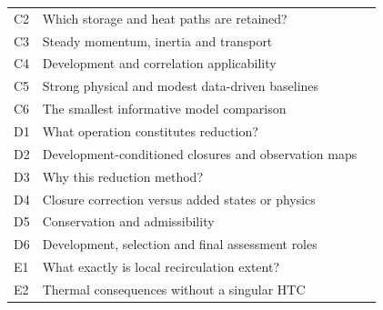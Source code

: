 \begin{longtable}{@{}p{0.45in}p{4.85in}p{0.40in}@{}}
C2 & Which storage and heat paths are retained? & \hyperref[topic:which-storage-and-heat-paths-are-retained]{\pageref*{topic:which-storage-and-heat-paths-are-retained}}\\
C3 & Steady momentum, inertia and transport & \hyperref[topic:steady-momentum-inertia-and-transport]{\pageref*{topic:steady-momentum-inertia-and-transport}}\\
C4 & Development and correlation applicability & \hyperref[topic:development-and-correlation-applicability]{\pageref*{topic:development-and-correlation-applicability}}\\
C5 & Strong physical and modest data-driven baselines & \hyperref[topic:strong-physical-and-modest-data-driven-baselines]{\pageref*{topic:strong-physical-and-modest-data-driven-baselines}}\\
C6 & The smallest informative model comparison & \hyperref[topic:the-smallest-informative-model-comparison]{\pageref*{topic:the-smallest-informative-model-comparison}}\\
D1 & What operation constitutes reduction? & \hyperref[topic:what-operation-constitutes-reduction]{\pageref*{topic:what-operation-constitutes-reduction}}\\
D2 & Development-conditioned closures and observation maps & \hyperref[topic:development-conditioned-closures-and-observation-maps]{\pageref*{topic:development-conditioned-closures-and-observation-maps}}\\
D3 & Why this reduction method? & \hyperref[topic:why-this-reduction-method]{\pageref*{topic:why-this-reduction-method}}\\
D4 & Closure correction versus added states or physics & \hyperref[topic:closure-correction-versus-added-states-or-physics]{\pageref*{topic:closure-correction-versus-added-states-or-physics}}\\
D5 & Conservation and admissibility & \hyperref[topic:conservation-and-admissibility]{\pageref*{topic:conservation-and-admissibility}}\\
D6 & Development, selection and final assessment roles & \hyperref[topic:development-selection-and-final-assessment-roles]{\pageref*{topic:development-selection-and-final-assessment-roles}}\\
E1 & What exactly is local recirculation extent? & \hyperref[topic:what-exactly-is-local-recirculation-extent]{\pageref*{topic:what-exactly-is-local-recirculation-extent}}\\
E2 & Thermal consequences without a singular HTC & \hyperref[topic:thermal-consequences-without-a-singular-htc]{\pageref*{topic:thermal-consequences-without-a-singular-htc}}\\

\end{longtable}
